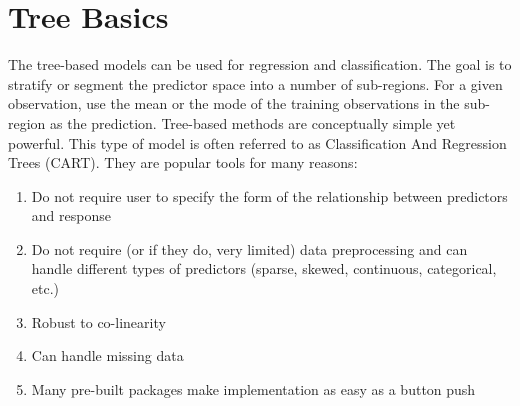 \documentclass[12pt,]{krantz}
\makeatletter
\newenvironment{Shaded}{\begin{snugshade}}{\end{snugshade}}
\newcommand{\CommentTok}[1]{\textcolor[rgb]{0.37,0.37,0.37}{\textit{#1}}}
\newcommand{\ControlFlowTok}[1]{\textcolor[rgb]{0.27,0.27,0.27}{\textbf{#1}}}
\newcommand{\DataTypeTok}[1]{\textcolor[rgb]{0.27,0.27,0.27}{#1}}
\newcommand{\DecValTok}[1]{\textcolor[rgb]{0.06,0.06,0.06}{#1}}
\newcommand{\KeywordTok}[1]{\textcolor[rgb]{0.27,0.27,0.27}{\textbf{#1}}}
\newcommand{\NormalTok}[1]{#1}
\newcommand{\OperatorTok}[1]{\textcolor[rgb]{0.43,0.43,0.43}{\textbf{#1}}}
\newcommand{\OtherTok}[1]{\textcolor[rgb]{0.37,0.37,0.37}{#1}}
\newcommand{\StringTok}[1]{\textcolor[rgb]{0.5,0.5,0.5}{#1}}
\providecommand{\tightlist}{%
  \setlength{\itemsep}{0pt}\setlength{\parskip}{0pt}}
\newenvironment{kframe}{%
\medskip{}
\setlength{\fboxsep}{.8em}
 \def\at@end@of@kframe{}%
 \ifinner\ifhmode%
  \def\at@end@of@kframe{\end{minipage}}%
  \begin{minipage}{\columnwidth}%
 \fi\fi%
 \def\FrameCommand##1{\hskip\@totalleftmargin \hskip-\fboxsep
 \colorbox{shadecolor}{##1}\hskip-\fboxsep
     \hskip-\linewidth \hskip-\@totalleftmargin \hskip\columnwidth}%
 \MakeFramed {\advance\hsize-\width
   \@totalleftmargin\z@ \linewidth\hsize
   \@setminipage}}%
 {\par\unskip\endMakeFramed%
 \at@end@of@kframe}
\renewenvironment{Shaded}{\begin{kframe}}{\end{kframe}}
\makeatother
\begin{document}
\begin{Shaded}
\end{Shaded}

\hypertarget{tree-basics}{%
\section{Tree Basics}\label{tree-basics}}

The tree-based models can be used for regression and classification. The goal is to stratify or segment the predictor space into a number of sub-regions. For a given observation, use the mean or the mode of the training observations in the sub-region as the prediction. Tree-based methods are conceptually simple yet powerful. This type of model is often referred to as Classification And Regression Trees (CART). They are popular tools for many reasons:

\begin{enumerate}
\def\labelenumi{\arabic{enumi}.}
\tightlist
\item
  Do not require user to specify the form of the relationship between predictors and response
\item
  Do not require (or if they do, very limited) data preprocessing and can handle different types of predictors (sparse, skewed, continuous, categorical, etc.)
\item
  Robust to co-linearity
\item
  Can handle missing data
\item
  Many pre-built packages make implementation as easy as a button push
\end{enumerate}
\end{document}
